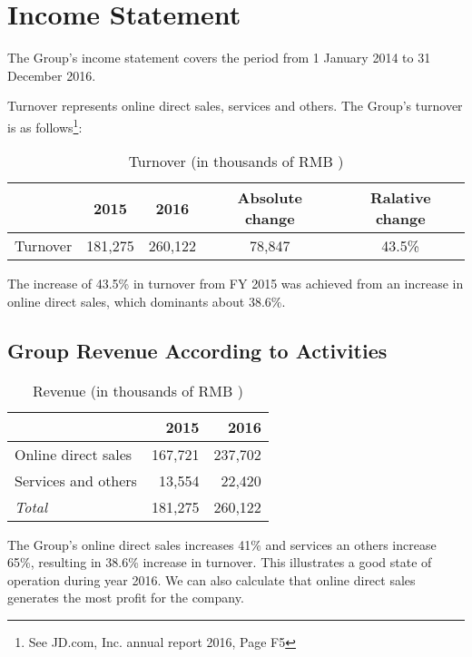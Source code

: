 \section{Income Statement}

The Group’s income statement covers the period from 1 January 2014 to 31 December 2016.

Turnover represents online direct sales, services and others. The Group’s turnover is as follows\footnote{See JD.com, Inc. annual report 2016, Page F5}:
\begin{table}[H]	
	\begin{center}
		\begin{tabular}{lcccc}
			\toprule
			 &\textbf{2015}&\textbf{2016}&\textbf{Absolute change}&\textbf{Ralative change}\\
			 
			\midrule
	    	Turnover&181,275&260,122&78,847&43.5\%\\
			\bottomrule
		\end{tabular}
	\end{center}
	\caption{Turnover (in thousands of RMB \textyen)}\label{table:1}
\end{table}

The increase of 43.5\% in turnover from FY 2015 was achieved from an increase in online direct sales, which dominants about 38.6\%.

\subsection{Group Revenue According to Activities}

\begin{table}[H]	
	\begin{center}
		\begin{tabular}{lrr}
			\toprule
			&\textbf{2015}&\textbf{2016}\\
			\midrule
		    Online direct sales&167,721&237,702\\
			Services and others&13,554&22,420\\
			\qquad\emph{Total}&181,275&260,122\\
			\bottomrule
		\end{tabular}
	\end{center}
	\caption{Revenue (in thousands of RMB \textyen)}\label{table:1}
\end{table}

The Group’s online direct sales increases 41\% and services an others increase 65\%, resulting in 38.6\% increase in turnover. This illustrates a good state of operation during year 2016. We can also calculate that online direct sales generates the most profit for the company.

